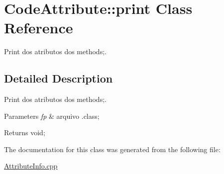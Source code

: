 \hypertarget{class_code_attribute_1_1print}{}\section{Code\+Attribute\+:\+:print Class Reference}
\label{class_code_attribute_1_1print}


Print dos atributos dos methods;.  




\subsection{Detailed Description}
Print dos atributos dos methods;. 


\begin{DoxyParams}{Parameters}
{\em fp} & arquivo .class; \\
\hline
\end{DoxyParams}
\begin{DoxyReturn}{Returns}
void; 
\end{DoxyReturn}


The documentation for this class was generated from the following file\+:\begin{DoxyCompactItemize}
\item 
\hyperlink{_attribute_info_8cpp}{Attribute\+Info.\+cpp}\end{DoxyCompactItemize}
